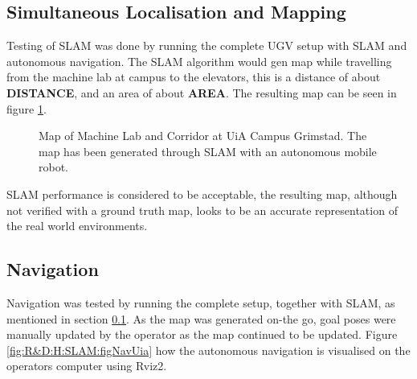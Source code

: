 \subsection{Simultaneous Localisation and Mapping}\label{sec:R&D:AN:SLAM}
Testing of SLAM was done by running the complete UGV setup with SLAM and autonomous navigation. The SLAM algorithm would gen  map while travelling from the machine lab at campus to the elevators, this is a distance of about \textbf{DISTANCE}, and an area of about \textbf{AREA}. The resulting map can be seen in figure \ref{fig:R&D:AN:SLAM:figUiaMap}.

\begin{figure}[ht]
  \centering
  
  \caption{Map of Machine Lab and Corridor at UiA Campus Grimstad. The map has been generated through SLAM with an autonomous mobile robot.}
  \label{fig:R&D:AN:SLAM:figUiaMap}
\end{figure}

SLAM performance is considered to be acceptable, the resulting map, although not verified with a ground truth map, looks to be an accurate representation of the real world environments. 

\subsection{Navigation}\label{sec:R&D:AN:Navigation}
Navigation was tested by running the complete setup, together with SLAM, as mentioned in section \ref{sec:R&D:AN:SLAM}. As the map was generated on-the go, goal poses were manually updated by the operator as the map continued to be updated. Figure \ref{fig:R&D:H:SLAM:figNavUia} how the autonomous navigation is visualised on the operators computer using Rviz2.

